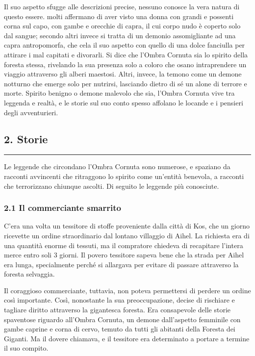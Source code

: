 Il suo aspetto sfugge alle descrizioni precise, nessuno conosce la vera
natura di questo essere. molti affermano di aver visto una donna con
grandi e possenti corna sul capo, con gambe e orecchie di capra, il cui
corpo nudo è coperto solo dal sangue; secondo altri invece si tratta di
un demonio assomigliante ad una capra antropomorfa, che cela il suo
aspetto con quello di una dolce fanciulla per attirare i mal capitati e
divorarli. Si dice che l'Ombra Cornuta sia lo spirito della foresta
stessa, rivelando la sua presenza solo a coloro che osano intraprendere
un viaggio attraverso gli alberi maestosi. Altri, invece, la temono come
un demone notturno che emerge solo per nutrirsi, lasciando dietro di sé
un alone di terrore e morte. Spirito benigno o demone malevolo che sia,
l'Ombra Cornuta vive tra leggenda e realtà, e le storie sul suo conto
spesso affolano le locande e i pensieri degli avventurieri.

\subsection{2. Storie}\label{storie}

\begin{center}\rule{0.5\linewidth}{0.5pt}\end{center}

Le leggende che circondano l'Ombra Cornuta sono numerose, e spaziano da
racconti avvincenti che ritraggono lo spirito come un'entità benevola, a
racconti che terrorizzano chiunque ascolti. Di seguito le leggende più
conosciute.

\subsubsection{2.1 Il commerciante
smarrito}\label{il-commerciante-smarrito}

C'era una volta un tessitore di stoffe proveniente dalla città di Kos,
che un giorno ricevette un ordine straordinario dal lontano villaggio di
Aihel. La richiesta era di una quantità enorme di tessuti, ma il
compratore chiedeva di recapitare l'intera merce entro soli 3 giorni. Il
povero tessitore sapeva bene che la strada per Aihel era lunga,
specialmente perché si allargava per evitare di passare attraverso la
foresta selvaggia.

Il coraggioso commerciante, tuttavia, non poteva permettersi di perdere
un ordine così importante. Così, nonostante la sua preoccupazione,
decise di rischiare e tagliare diritto attraverso la gigantesca foresta.
Era consapevole delle storie spaventose riguardo all'Ombra Cornuta, un
demone dall'aspetto femminile con gambe caprine e corna di cervo, temuto
da tutti gli abitanti della Foresta dei Giganti. Ma il dovere chiamava,
e il tessitore era determinato a portare a termine il suo compito.

